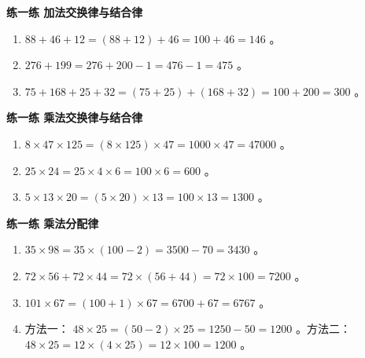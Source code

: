 \begin{answer}


\textbf{练一练 加法交换律与结合律}

\begin{enumerate}
  \item $88 + 46 + 12 = (88 + 12) + 46 = 100 + 46 = 146$ 。
  \item $276 + 199 = 276 + 200 - 1 = 476 - 1 = 475$ 。
  \item $75 + 168 + 25 + 32 = (75 + 25) + (168 + 32) = 100 + 200 = 300$ 。
\end{enumerate}


\textbf{练一练 乘法交换律与结合律}

\begin{enumerate}
  \item $8 \times 47 \times 125 = (8 \times 125) \times 47 = 1000 \times 47 = 47000$ 。
  \item $25 \times 24 = 25 \times 4 \times 6 = 100 \times 6 = 600$ 。
  \item $5 \times 13 \times 20 = (5 \times 20) \times 13 = 100 \times 13 = 1300$ 。
\end{enumerate}


\textbf{练一练 乘法分配律}

\begin{enumerate}
  \item $35 \times 98 = 35 \times (100 - 2) = 3500 - 70 = 3430$ 。
  \item $72 \times 56 + 72 \times 44 = 72 \times (56 + 44) = 72 \times 100 = 7200$ 。
  \item $101 \times 67 = (100 + 1) \times 67 = 6700 + 67 = 6767$ 。
  \item 方法一： $48 \times 25 = (50 - 2) \times 25 = 1250 - 50 = 1200$ 。方法二： $48 \times 25 = 12 \times (4 \times 25) = 12 \times 100 = 1200$ 。
\end{enumerate}


\end{answer}
